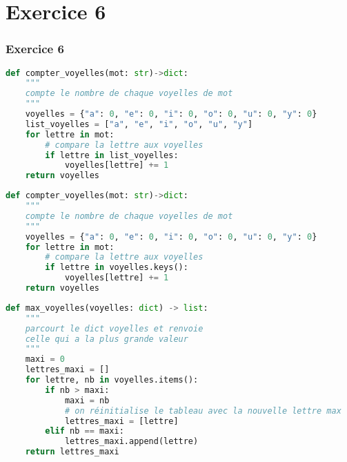 \documentclass[svgnames,11pt]{beamer}
\begin{document}
\section{Exercice 6}
\begin{frame}[fragile]
    \frametitle{Exercice 6}

\begin{center}
\begin{lstlisting}[language=Python , basicstyle=\ttfamily\small, xleftmargin=0em, xrightmargin=-6em]
def compter_voyelles(mot: str)->dict:
    """
    compte le nombre de chaque voyelles de mot
    """
    voyelles = {"a": 0, "e": 0, "i": 0, "o": 0, "u": 0, "y": 0}
    list_voyelles = ["a", "e", "i", "o", "u", "y"]
    for lettre in mot:
        # compare la lettre aux voyelles
        if lettre in list_voyelles:
            voyelles[lettre] += 1
    return voyelles
\end{lstlisting}
\end{center}    

\end{frame}
\begin{frame}[fragile]

\begin{center}
\begin{lstlisting}[language=Python , basicstyle=\ttfamily\small, xleftmargin=0em, xrightmargin=-6em]
def compter_voyelles(mot: str)->dict:
    """
    compte le nombre de chaque voyelles de mot
    """
    voyelles = {"a": 0, "e": 0, "i": 0, "o": 0, "u": 0, "y": 0}
    for lettre in mot:
        # compare la lettre aux voyelles
        if lettre in voyelles.keys():
            voyelles[lettre] += 1
    return voyelles
\end{lstlisting}
\end{center}    

\end{frame}
\begin{frame}[fragile]

\begin{center}
\begin{lstlisting}[language=Python , basicstyle=\ttfamily\small, xleftmargin=1em, xrightmargin=0em]
def max_voyelles(voyelles: dict) -> list:
    """
    parcourt le dict voyelles et renvoie
    celle qui a la plus grande valeur
    """
    maxi = 0
    lettres_maxi = []
    for lettre, nb in voyelles.items():
        if nb > maxi:
            maxi = nb
            # on réinitialise le tableau avec la nouvelle lettre max
            lettres_maxi = [lettre]
        elif nb == maxi:
            lettres_maxi.append(lettre)
    return lettres_maxi
\end{lstlisting}
\end{center}    
    
    \end{frame}
\end{document}
